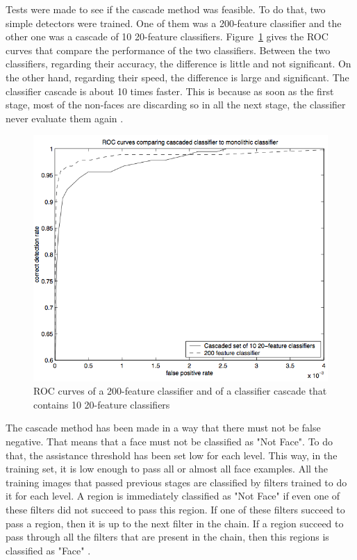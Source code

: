 \noindent Tests were made to see if the cascade method was feasible. To do that, two simple detectors were trained. One of them was a 200-feature classifier and the other one was a cascade of 10 20-feature classifiers. Figure~\ref{haar_feature_cascade_example_result} gives the ROC curves that compare the performance of the two classifiers. Between the two classifiers, regarding their accuracy, the difference is little and not significant. On the other hand, regarding their speed, the difference is large and significant. The classifier cascade is about 10 times faster. This is because as soon as the first stage, most of the non-faces are discarding so in all the next stage, the classifier never evaluate them again \cite{VIO01}.
\newline

\begin{figure}[!h]
\begin{center}
\noindent \includegraphics[scale=0.6]{figures/haar_feature_cascade_example_result} 
\newline
\caption{ROC curves of a 200-feature classifier and of a classifier cascade that contains 10 20-feature classifiers}
\label{haar_feature_cascade_example_result}
\end{center} 
\end{figure}

\noindent The cascade method has been made in a way that there must not be false negative. That means that a face must not be classified as "Not Face". To do that, the assistance threshold has been set low for each level. This way, in the training set, it is low enough to pass all or almost all face examples. All the training images that passed previous stages are classified by filters trained to do it for each level. A region is immediately classified as "Not Face" if even one of these filters did not succeed to pass this region. If one of these filters succeed to pass a region, then it is up to the next filter in the chain. If a region succeed to pass through all the filters that are present in the chain, then this regions is classified as "Face" \cite{HEW07}.
\newline

